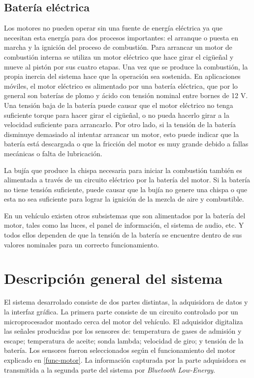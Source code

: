 \subsection{Batería eléctrica}
Los motores no pueden operar sin una fuente de energía eléctrica ya que necesitan esta energía para dos procesos importantes: el arranque o puesta en marcha y la ignición del proceso de combustión.
Para arrancar un motor de combustión interna se utiliza un motor eléctrico que hace girar el cigüeñal y mueve al pistón por sus cuatro etapas. Una vez que se produce la combustión, la propia inercia del sistema hace que la operación sea sostenida. En aplicaciones móviles, el motor eléctrico es alimentado por una batería eléctrica, que por lo general son baterías de plomo y ácido con tensión nominal entre bornes de 12 V. Una tensión baja de la batería puede causar que el motor eléctrico no tenga suficiente torque para hacer girar el cigüeñal, o no pueda hacerlo girar a la velocidad suficiente para arrancarlo. Por otro lado, si la tensión de la batería disminuye demasiado al intentar arrancar un motor, esto puede indicar que la batería está descargada o que la fricción del motor es muy grande debido a fallas mecánicas o falta de lubricación.

La bujía que produce la chispa necesaria para iniciar la combustión también es alimentada a través de un circuito eléctrico por la batería del motor. Si la batería no tiene tensión suficiente, puede causar que la bujía no genere una chispa o que esta no sea suficiente para lograr la ignición de la mezcla de aire y combustible.

En un vehículo existen otros subsistemas que son alimentados por la batería del motor, tales como las luces, el panel de información, el sistema de audio, etc. Y todos ellos dependen de que la tensión de la batería se encuentre dentro de sus valores nominales para un correcto funcionamiento.

\section{Descripción general del sistema}

El sistema desarrolado consiste de dos partes distintas, la adquisidora de datos y la interfaz gráfica. La primera parte consiste de un circuito controlado por un microprocesador montado cerca del motor del vehículo. El adquisidor digitaliza las señales producidas por los sensores de: temperatura de gases de admisión y escape; temperatura de aceite; sonda lambda; velocidad de giro; y tensión de la batería. Los sensores fueron seleccionados según el funcionamiento del motor explicado en \ref{func-motor}.  La información capturada por la parte adquisidora es transmitida a la segunda parte del sistema por \textit{Bluetooth Low-Energy}.

